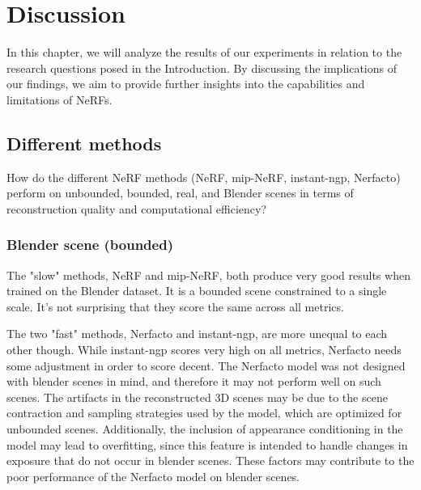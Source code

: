 \begin{comment}
- Loop back to the introduction, review - claim - agenda
    - In this thesis, we have seen how we can reconstruct 3D scenes and render novel views by optimizing NeRFs on 2D input images.
    - The pipeline for creating NeRFs has become greatly simplified recently. As we've seen we can without problems optimize a NeRF in ~4.5 minutes.


Results:
- Dataset size
- Different methods
- Capture method
- NeRF in VR

- Area size
\end{comment}

\chapter{Discussion}
In this chapter, we will analyze the results of our experiments in relation to the research questions posed in the Introduction. By discussing the implications of our findings, we aim to provide further insights into the capabilities and limitations of NeRFs.


\section{Different methods}
\begin{description}[leftmargin=!,labelwidth=\widthof{RQ 1:}]
\item[\textbf{RQ 1:}]
How do the different NeRF methods (NeRF, mip-NeRF, instant-ngp, Nerfacto) perform on unbounded, bounded, real, and Blender scenes in terms of reconstruction quality and computational efficiency?
\end{description}

\subsection{Blender scene (bounded)} \label{sec:blender-scene}
The "slow" methods, NeRF and mip-NeRF, both produce very good results when trained on the Blender dataset. It is a bounded scene constrained to a single scale. It's not surprising that they score the same across all metrics.

The two "fast" methods, Nerfacto and instant-ngp, are more unequal to each other though. While instant-ngp scores very high on all metrics, Nerfacto needs some adjustment in order to score decent. The Nerfacto model was not designed with blender scenes in mind, and therefore it may not perform well on such scenes. The artifacts in the reconstructed 3D scenes may be due to the scene contraction and sampling strategies used by the model, which are optimized for unbounded scenes. Additionally, the inclusion of appearance conditioning in the model may lead to overfitting, since this feature is intended to handle changes in exposure that do not occur in blender scenes. These factors may contribute to the poor performance of the Nerfacto model on blender scenes.

